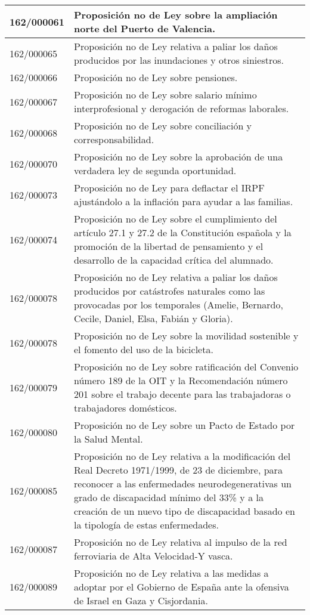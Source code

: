{\begin{table}[H]
\begin{center}
\begin{tabularx}{\linewidth}{| l | X |}
\hline
162/000061 & Proposición no de Ley sobre la ampliación norte del Puerto de Valencia. \\
\hline
162/000065 & Proposición no de Ley relativa a paliar los daños producidos por las inundaciones y otros siniestros. \\
\hline
162/000066 & Proposición no de Ley sobre pensiones. \\
\hline
162/000067 & Proposición no de Ley sobre salario mínimo interprofesional y derogación de reformas laborales. \\
\hline
162/000068 & Proposición no de Ley sobre conciliación y corresponsabilidad. \\
\hline
162/000070 & Proposición no de Ley sobre la aprobación de una verdadera ley de segunda oportunidad. \\
\hline
162/000073 & Proposición no de Ley para deflactar el IRPF ajustándolo a la inflación para ayudar a las familias. \\
\hline
162/000074 & Proposición no de Ley sobre el cumplimiento del artículo 27.1 y 27.2 de la Constitución española y la promoción de la libertad de pensamiento y el desarrollo de la capacidad crítica del alumnado. \\
\hline
162/000078 & Proposición no de Ley relativa a paliar los daños producidos por catástrofes naturales como las provocadas por los temporales (Amelie, Bernardo, Cecile, Daniel, Elsa, Fabián y Gloria). \\
\hline
162/000078 & Proposición no de Ley sobre la movilidad sostenible y el fomento del uso de la bicicleta. \\
\hline
162/000079 & Proposición no de Ley sobre ratificación del Convenio número 189 de la OIT y la Recomendación número 201 sobre el trabajo decente para las trabajadoras o trabajadores domésticos. \\
\hline
162/000080 & Proposición no de Ley sobre un Pacto de Estado por la Salud Mental. \\
\hline
162/000085 & Proposición no de Ley relativa a la modificación del Real Decreto 1971/1999, de 23 de diciembre, para reconocer a las enfermedades neurodegenerativas un grado de discapacidad mínimo del 33\% y a la creación de un nuevo tipo de discapacidad basado en la tipología de estas enfermedades. \\
\hline
162/000087 & Proposición no de Ley relativa al impulso de la red ferroviaria de Alta Velocidad-Y vasca. \\
\hline
162/000089 & Proposición no de Ley relativa a las medidas a adoptar por el Gobierno de España ante la ofensiva de Israel en Gaza y Cisjordania. \\

\end{tabularx}
\end{center}
\end{table}}
